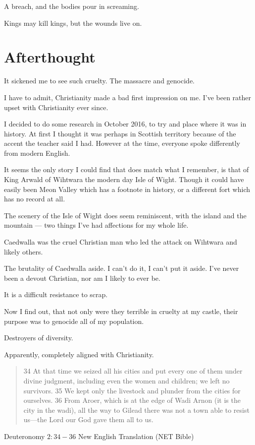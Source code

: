 A breach, and the bodies pour in screaming. 

Kings may kill kings, but the wounds live on. 
\section{Afterthought}

It sickened me to see such cruelty. The massacre and genocide. 

I have to admit, Christianity made a bad first impression on me. 
I've been rather upset with Christianity ever since. 

I decided to do some research in October 2016, to try and place where it was in
history. At first I thought it was perhaps in Scottish territory because of the
accent the teacher said I had. However at the time, everyone spoke differently
from modern English. 

It seems the only story I could find that does match what I remember, is that of
King Arwald of Wihtwara the modern day Isle of Wight.  
Though it could have easily been Meon Valley which has a footnote in history, 
or a different fort which has no record at all. 

The scenery of the Isle of Wight does seem reminiscent, with the island and the
mountain --- two things I've had affections for my whole life. 

Caedwalla was the cruel Christian man who led the attack on Wihtwara and likely
others.

The brutality of Caedwalla aside. I can't do it, I can't put it aside. 
I've never been a devout Christian, nor am I likely to ever be. 

It is a difficult resistance to scrap. 

Now I find out, that not only were they terrible in cruelty at my castle,
their purpose was to genocide all of my population.

Destroyers of diversity. 

Apparently, completely aligned with Christianity. 

\blockquote{34 At that time we seized all his cities and put every one of them 
under divine judgment, including even the women and children; we left no 
survivors. 35 We kept only the livestock and plunder from the cities for 
ourselves. 36 From Aroer, which is at the edge of Wadi Arnon (it is the city in
 the wadi), all the way to Gilead there was not a town able to resist us—the 
Lord our God gave them all to us.}{Deuteronomy $2:34-36$ New English Translation
(NET Bible)}
 
